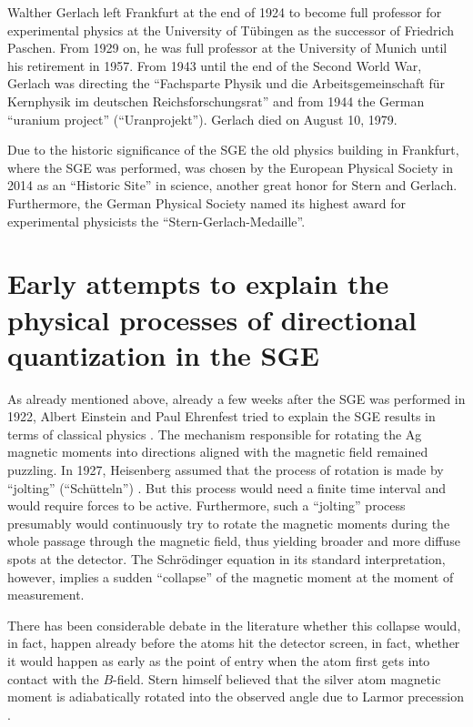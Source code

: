 \documentclass{article}
\begin{document}
Walther Gerlach left Frankfurt at the end of 1924 to become full professor for experimental physics at the University of Tübingen as the successor of Friedrich Paschen. From 1929 on, he was full professor at the University of Munich until his retirement in 1957. From 1943 until the end of the Second World War, Gerlach was directing the ``Fachsparte Physik und die Arbeitsgemeinschaft für Kernphysik im deutschen Reichsforschungsrat'' and from 1944 the German ``uranium project'' (``Uranprojekt''). Gerlach died on August 10, 1979. 

Due to the historic significance of the SGE the old physics building in Frankfurt, where the SGE was performed, was chosen by the European Physical Society in 2014 as an ``Historic Site'' in science, another great honor for Stern and Gerlach. Furthermore, the German Physical Society named its highest award for experimental physicists the ``Stern-Gerlach-Medaille''.

\section{Early attempts to explain the physical processes of directional quantization in the SGE}

As already mentioned above, already a few weeks after the SGE was performed in 1922, Albert Einstein and Paul Ehrenfest tried to explain the SGE results in terms of classical physics \citep{EinsteinAEtAl1922Bemerkungen}. The mechanism responsible for rotating the Ag magnetic moments into directions aligned with the magnetic field remained puzzling. In 1927, Heisenberg  assumed that the process of rotation is made by ``jolting'' (``Schütteln'') \citep{HeisenbergW1927Inhalt}. But this process would need a finite time interval and would require forces to be active. Furthermore, such a ``jolting'' process presumably would continuously try to rotate the magnetic moments during the whole passage through the magnetic field, thus yielding broader and more diffuse spots at the detector. The Schrödinger equation in its standard interpretation, however, implies a sudden ``collapse'' of the magnetic moment at the moment of measurement. 

There has been considerable debate in the literature whether this collapse would, in fact, happen already before the atoms hit the detector screen, in fact, whether it would happen as early as the point of entry when the atom first gets into contact with the $B$-field. Stern himself believed that the silver atom magnetic moment is adiabatically rotated into the observed angle due to Larmor precession \citep{PhippsTEtal1932Einstellung}.  
\end{document}
